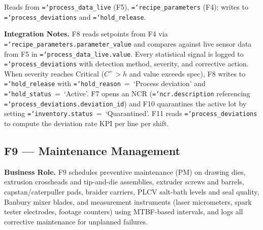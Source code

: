 \documentclass[11pt]{article}
\newcommand{\tfield}[1]{\texttt{\hyphenchar\font=`\-\relax #1}}
\begin{document}
Reads from \tfield{process\_data\_live} (F5), \tfield{recipe\_parameters} (F4); writes to \tfield{process\_deviations} and \tfield{hold\_release}.

\textbf{Integration Notes.}
F8 reads setpoints from F4 via \tfield{recipe\_parameters.parameter\_value} and compares against live sensor data from F5 in \tfield{process\_data\_live.value}.  Every statistical signal is logged to \tfield{process\_deviations} with detection method, severity, and corrective action.  When severity reaches Critical ($C^+ > h$ and value exceeds spec), F8 writes to \tfield{hold\_release} with \tfield{hold\_reason}~=~`Process deviation' and \tfield{hold\_status}~=~`Active'.  F7 opens an NCR (\tfield{ncr.description} referencing \tfield{process\_deviations.deviation\_id}) and F10 quarantines the active lot by setting \tfield{inventory.status}~=~`Quarantined'.  F11 reads \tfield{process\_deviations} to compute the deviation rate KPI per line per shift.

\subsection{F9 --- Maintenance Management}

\textbf{Business Role.}
F9 schedules preventive maintenance (PM) on drawing dies, extrusion crossheads and tip-and-die assemblies, extruder screws and barrels, capstan/caterpuller pads, braider carriers, PLCV salt-bath levels and seal quality, Banbury mixer blades, and measurement instruments (laser micrometers, spark tester electrodes, footage counters) using MTBF-based intervals, and logs all corrective maintenance for unplanned failures.
\end{document}
